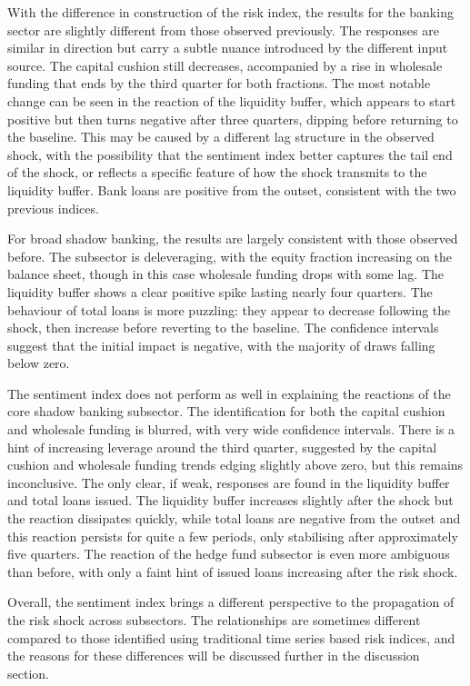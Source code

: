\documentclass[12pt,a4paper]{report}
\begin{document}
With the difference in construction of the risk index, the results for the banking sector are slightly different from those observed previously. The responses are similar in direction but carry a subtle nuance introduced by the different input source. The capital cushion still decreases, accompanied by a rise in wholesale funding that ends by the third quarter for both fractions. The most notable change can be seen in the reaction of the liquidity buffer, which appears to start positive but then turns negative after three quarters, dipping before returning to the baseline. This may be caused by a different lag structure in the observed shock, with the possibility that the sentiment index better captures the tail end of the shock, or reflects a specific feature of how the shock transmits to the liquidity buffer. Bank loans are positive from the outset, consistent with the two previous indices.

For broad shadow banking, the results are largely consistent with those observed before. The subsector is deleveraging, with the equity fraction increasing on the balance sheet, though in this case wholesale funding drops with some lag. The liquidity buffer shows a clear positive spike lasting nearly four quarters. The behaviour of total loans is more puzzling: they appear to decrease following the shock, then increase before reverting to the baseline. The confidence intervals suggest that the initial impact is negative, with the majority of draws falling below zero.

The sentiment index does not perform as well in explaining the reactions of the core shadow banking subsector. The identification for both the capital cushion and wholesale funding is blurred, with very wide confidence intervals. There is a hint of increasing leverage around the third quarter, suggested by the capital cushion and wholesale funding trends edging slightly above zero, but this remains inconclusive. The only clear, if weak, responses are found in the liquidity buffer and total loans issued. The liquidity buffer increases slightly after the shock but the reaction dissipates quickly, while total loans are negative from the outset and this reaction persists for quite a few periods, only stabilising after approximately five quarters.
The reaction of the hedge fund subsector is even more ambiguous than before, with only a faint hint of issued loans increasing after the risk shock.

Overall, the sentiment index brings a different perspective to the propagation of the risk shock across subsectors. The relationships are sometimes different compared to those identified using traditional time series based risk indices, and the reasons for these differences will be discussed further in the discussion section.
\end{document}
